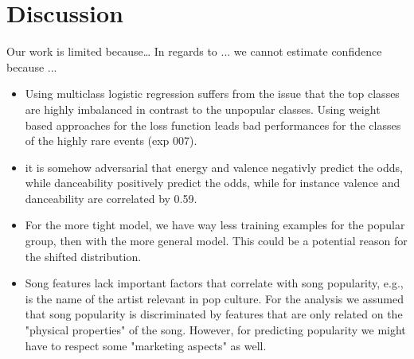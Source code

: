 \documentclass{article}
\begin{document}
  

\section{Discussion}
Our work is limited because\dots
In regards to ... we cannot estimate confidence because ...

\begin{itemize}
  \item Using multiclass logistic regression suffers from the issue that the top classes are highly imbalanced in contrast to the unpopular classes. Using weight based approaches for the loss function leads bad performances for the classes of the highly rare events (exp 007). 
  \item it is somehow adversarial that energy and valence negativly predict the odds, while danceability positively predict the odds, while for instance valence and danceability are correlated by 0.59.
\end{itemize}

\begin{itemize}
  \item For the more tight model, we have way less training examples for the popular group, then with the more general model. This could be a potential reason for the shifted distribution.
  \item Song features lack important factors that correlate with song popularity, e.g., is the name of the artist relevant in pop culture. For the analysis we assumed that song popularity is discriminated by features that are only related on the "physical properties" of the song. However, for predicting popularity we might have to respect some "marketing aspects" as well. 
\end{itemize}


% 
\printbibliography
\end{document}

